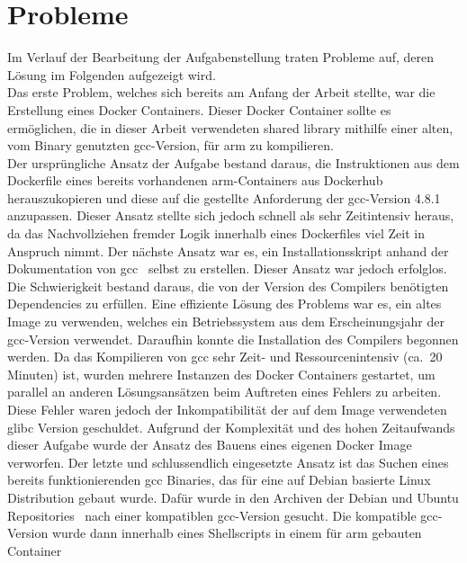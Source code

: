 \section{Probleme}\label{sec:probleme}
Im Verlauf der Bearbeitung der Aufgabenstellung traten Probleme auf, deren Lösung im Folgenden aufgezeigt wird. \\
\linebreak
Das erste Problem, welches sich bereits am Anfang der Arbeit stellte, war die Erstellung eines Docker Containers.
Dieser Docker Container sollte es ermöglichen, die in dieser Arbeit verwendeten shared library mithilfe einer alten,
vom Binary genutzten \gls{gcc}-Version, für \gls{arm} zu kompilieren. \\
Der ursprüngliche Ansatz der Aufgabe bestand daraus, die Instruktionen aus dem Dockerfile eines bereits vorhandenen \gls{arm}-Containers
aus Dockerhub~\cite{docker-gcc} herauszukopieren und diese auf die gestellte Anforderung der \gls{gcc}-Version 4.8.1 anzupassen.
Dieser Ansatz stellte sich jedoch schnell als sehr Zeitintensiv heraus, da das Nachvollziehen fremder Logik innerhalb eines
Dockerfiles viel Zeit in Anspruch nimmt.
Der nächste Ansatz war es, ein Installationsskript anhand der Dokumentation von \gls{gcc}~\cite{gcc-doc} selbst zu erstellen.
Dieser Ansatz war jedoch erfolglos.
Die Schwierigkeit bestand daraus, die von der Version des Compilers benötigten Dependencies zu erfüllen.
Eine effiziente Lösung des Problems war es, ein altes Image zu verwenden, welches ein Betriebssystem aus dem Erscheinungsjahr
der \gls{gcc}-Version verwendet.
Daraufhin konnte die Installation des Compilers begonnen werden.
Da das Kompilieren von \gls{gcc} sehr Zeit- und Ressourcenintensiv (ca.\ 20 Minuten) ist, wurden mehrere Instanzen des Docker Containers gestartet,
um parallel an anderen Lösungsansätzen beim Auftreten eines Fehlers zu arbeiten.
Diese Fehler waren jedoch der Inkompatibilität der auf dem Image verwendeten glibc Version geschuldet.
Aufgrund der Komplexität und des hohen Zeitaufwands dieser Aufgabe wurde der Ansatz des Bauens eines eigenen Docker Image
verworfen.
Der letzte und schlussendlich eingesetzte Ansatz ist das Suchen eines bereits funktionierenden \gls{gcc} Binaries, das
für eine auf Debian basierte Linux Distribution gebaut wurde.
Dafür wurde in den Archiven der Debian und Ubuntu Repositories~\cite{ubuntu-archive} nach einer kompatiblen \gls{gcc}-Version gesucht.
Die kompatible \gls{gcc}-Version wurde dann innerhalb eines Shellscripts in einem für \gls{arm} gebauten Container
